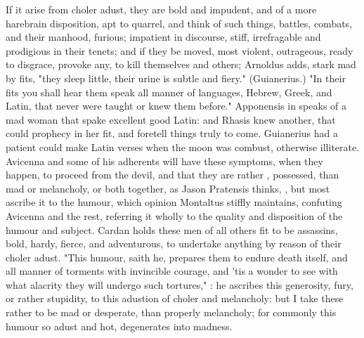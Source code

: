 {If it arise from choler adust, they are bold and impudent, and of a more
harebrain disposition, apt to quarrel, and think of such things, battles,
combats, and their manhood, furious; impatient in discourse, stiff,
irrefragable and prodigious in their tenets; and if they be moved, most
violent, outrageous, ready to disgrace, provoke any, to
kill themselves and others; Arnoldus adds, stark mad by fits,
"they sleep little, their urine is subtle and fiery."
(Guianerius.) "In their fits you shall hear them speak all manner of languages,
Hebrew, Greek, and Latin, that never were taught or knew them before."
Apponensis in  speaks of a mad
woman that spake excellent good Latin: and Rhasis knew another, that could
prophecy in her fit, and foretell things truly to come.
Guianerius had a patient could make Latin verses when the
moon was combust, otherwise illiterate. Avicenna and some of his adherents will
have these symptoms, when they happen, to proceed from the devil, and that they
are rather , possessed, than mad or melancholy, or both together,
as Jason Pratensis thinks, , \etc{} but most
ascribe it to the humour, which opinion Montaltus  stiffly maintains, confuting Avicenna and the rest, referring it wholly
to the quality and disposition of the humour and subject. Cardan
 holds these men of all
others fit to be assassins, bold, hardy, fierce, and adventurous, to undertake
anything by reason of their choler adust. "This humour,
saith he, prepares them to endure death itself, and all manner of torments with
invincible courage, and 'tis a wonder to see with what alacrity they will
undergo such tortures," : he ascribes this
generosity, fury, or rather stupidity, to this adustion of choler and
melancholy: but I take these rather to be mad or desperate, than properly
melancholy; for commonly this humour so adust and hot, degenerates into
madness.

}
